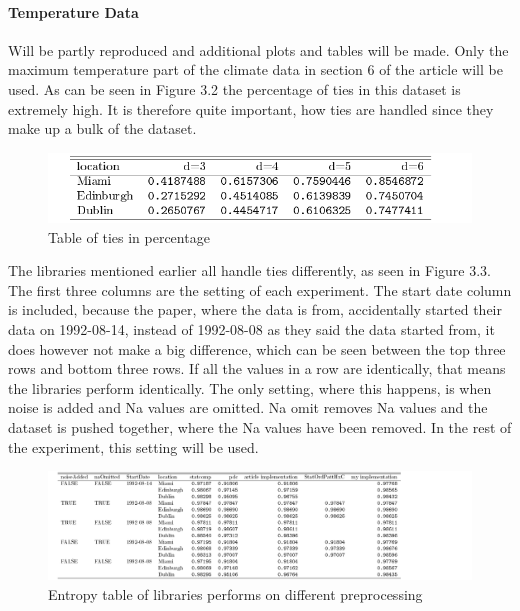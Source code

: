 \FloatBarrier

\paragraph{Temperature Data}
\cite{Chagas2022} Will be partly reproduced and additional plots and tables will be made. Only the maximum temperature part of the climate data in section 6 of the article will be used. As can be seen in Figure 3.2 the percentage of ties in this dataset is extremely high. It is therefore quite important, how ties are handled since they make up a bulk of the dataset. 
\begin{figure}
    \centering
    \includegraphics{../../Weather/tiesTable.pdf}
    \caption{Table of ties in percentage}
\end{figure}


The libraries mentioned earlier all handle ties differently, as seen in Figure 3.3. The first three columns are the setting of each experiment. The start date column is included, because the paper, where the data is from, accidentally started their data on 1992-08-14, instead of 1992-08-08 as they said the data started from, it does however not make a big difference, which can be seen between the top three rows and bottom three rows.  If all the values in a row are identically, that means the libraries perform identically. The only setting, where this happens, is when noise is added and Na values are omitted. Na omit removes Na values and the dataset is pushed together, where the Na values have been removed. In the rest of the experiment, this setting will be used. 

\begin{figure}
    \centering
    \includegraphics[width=\textwidth,keepaspectratio]{../../Weather/entropyTable.pdf}
    \caption{Entropy table of libraries performs on different preprocessing}
\end{figure}

